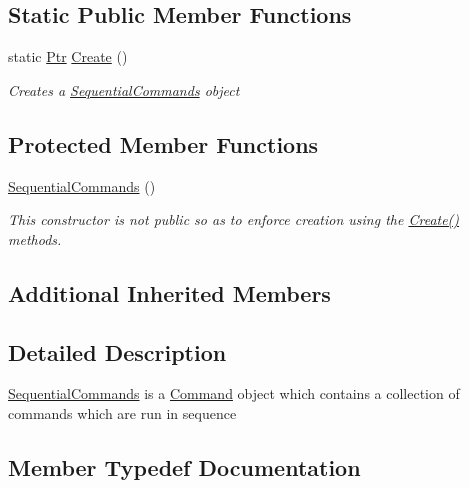 \subsection*{Static Public Member Functions}
\begin{DoxyCompactItemize}
\item 
static \mbox{\hyperlink{class_command_lib_1_1_command_a3b3e4f00144373299df5c6bb1acc319d}{Ptr}} \mbox{\hyperlink{class_command_lib_1_1_sequential_commands_aaacdef25d7dba29bae8ff7763c55017e}{Create}} ()
\begin{DoxyCompactList}\small\item\em Creates a \mbox{\hyperlink{class_command_lib_1_1_sequential_commands}{Sequential\+Commands}} object \end{DoxyCompactList}\end{DoxyCompactItemize}
\subsection*{Protected Member Functions}
\begin{DoxyCompactItemize}
\item 
\mbox{\hyperlink{class_command_lib_1_1_sequential_commands_ab4cbf775a047942c6fce735980f19bb0}{Sequential\+Commands}} ()
\begin{DoxyCompactList}\small\item\em This constructor is not public so as to enforce creation using the \mbox{\hyperlink{class_command_lib_1_1_sequential_commands_aaacdef25d7dba29bae8ff7763c55017e}{Create()}} methods. \end{DoxyCompactList}\end{DoxyCompactItemize}
\subsection*{Additional Inherited Members}


\subsection{Detailed Description}
\mbox{\hyperlink{class_command_lib_1_1_sequential_commands}{Sequential\+Commands}} is a \mbox{\hyperlink{class_command_lib_1_1_command}{Command}} object which contains a collection of commands which are run in sequence 



\subsection{Member Typedef Documentation}
\mbox{\label{class_command_lib_1_1_sequential_commands_a833e8df5749f6f13b93eaa1d724799e9}} 
